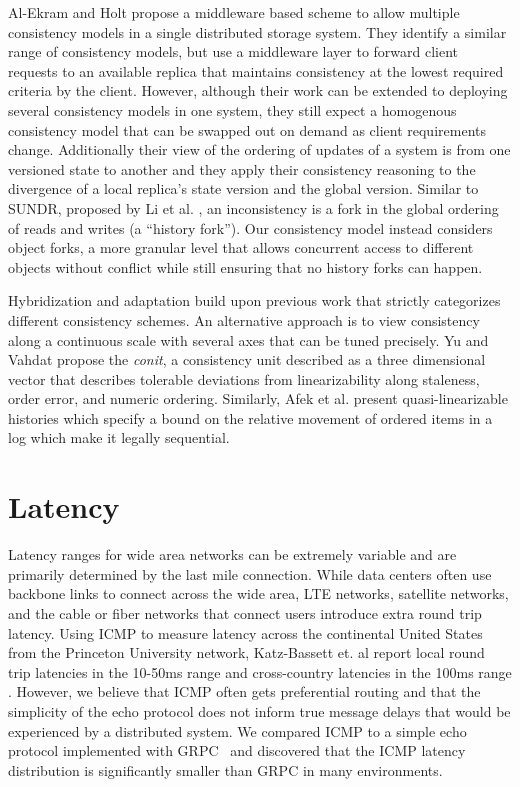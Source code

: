 \documentclass[10pt,conference,letterpaper]{IEEEtran}
\begin{document}
Al-Ekram and Holt \cite{al-ekram_multi-consistency_2010} propose a middleware based scheme to allow multiple consistency models in a single distributed storage system. They identify a similar range of consistency models, but use a middleware layer to forward client requests to an available replica that maintains consistency at the lowest required criteria by the client. However, although their work can be extended to deploying several consistency models in one system, they still expect a homogenous consistency model that can be swapped out on demand as client requirements change. Additionally their view of the ordering of updates of a system is from one versioned state to another and they apply their consistency reasoning to the divergence of a local replica's state version and the global version. Similar to SUNDR, proposed by Li et al. \cite{li_secure_2004}, an inconsistency is a fork in the global ordering of reads and writes (a ``history fork''). Our consistency model instead considers object forks, a more granular level that allows concurrent access to different objects without conflict while still ensuring that no history forks can happen.

Hybridization and adaptation build upon previous work that strictly categorizes different consistency schemes. An alternative approach is to view consistency along a continuous scale with several axes that can be tuned precisely. Yu and Vahdat \cite{yu_design_2002} propose the \textit{conit}, a consistency unit described as a three dimensional vector that describes tolerable deviations from linearizability along staleness, order error, and numeric ordering. Similarly, Afek et al. \cite{afek_quasi-linearizability:_2010} present quasi-linearizable histories which specify a bound on the relative movement of ordered items in a log which make it legally sequential.

\section{Latency}

Latency ranges for wide area networks can be extremely variable and are primarily
determined by the last mile connection.
While data centers often use backbone links to connect across the wide area, LTE networks,
satellite networks, and the cable or fiber networks that connect users introduce extra
round trip latency.
Using ICMP to measure latency across the continental United States from the Princeton
University network, Katz-Bassett et.
al report local round trip latencies in the 10-50ms range and cross-country latencies in
the 100ms range \cite{katz-bassett_towards_2006}.
However, we believe that ICMP often gets preferential routing and that the simplicity of
the echo protocol does not inform true message delays that would be experienced by a
distributed system.
We compared ICMP to a simple echo protocol implemented with GRPC~\cite{grpc} and discovered that the
ICMP latency distribution is significantly smaller than GRPC in many environments.
\end{document}
